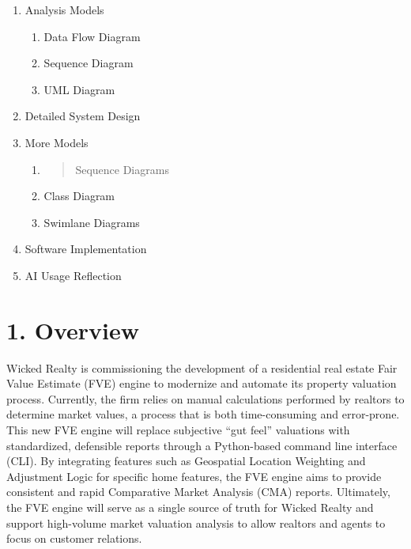 \begin{enumerate}
  \begin{enumerate}
  \def\labelenumii{\alph{enumii}.}
  \item
    Performance Requirements
  \item
    Maintainability Requirements
  \item
    Availability Requirements
  \item
    Other SQA Req
  \end{enumerate}
\item
  Analysis Models

  \begin{enumerate}
  \def\labelenumii{\alph{enumii}.}
  \item
    Data Flow Diagram
  \item
    Sequence Diagram
  \item
    UML Diagram
  \end{enumerate}
\item
  Detailed System Design
\item
  More Models

  \begin{enumerate}
  \def\labelenumii{\alph{enumii}.}
  \item
    \begin{quote}
    Sequence Diagrams
    \end{quote}
  \item
    Class Diagram
  \item
    Swimlane Diagrams
  \end{enumerate}
\item
  Software Implementation
\item
  AI Usage Reflection
\end{enumerate}

\hypertarget{overview}{%
\section{1. Overview}\label{overview}}

Wicked Realty is commissioning the development of a residential real
estate Fair Value Estimate (FVE) engine to modernize and automate its
property valuation process. Currently, the firm relies on manual
calculations performed by realtors to determine market values, a process
that is both time-consuming and error-prone. This new FVE engine will
replace subjective ``gut feel'' valuations with standardized, defensible
reports through a Python-based command line interface (CLI). By
integrating features such as Geospatial Location Weighting and
Adjustment Logic for specific home features, the FVE engine aims to
provide consistent and rapid Comparative Market Analysis (CMA) reports.
Ultimately, the FVE engine will serve as a single source of truth for
Wicked Realty and support high-volume market valuation analysis to allow
realtors and agents to focus on customer relations.

